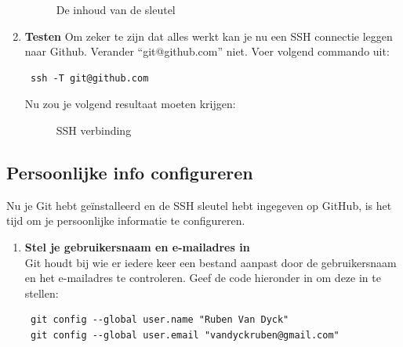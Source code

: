 \documentclass[12pt]{article} %
\begin{document}
\begin{enumerate}
\begin{figure}[H]
\caption{De inhoud van de sleutel}
\label{fig:sshkey}
\end{figure}

\item \textbf{Testen}
Om zeker te zijn dat alles werkt kan je nu een SSH connectie leggen naar Github.
Verander ``git@github.com'' niet. Voer volgend commando uit:
\begin{lstlisting}
 ssh -T git@github.com
\end{lstlisting}
Nu zou je volgend resultaat moeten krijgen:

\begin{figure}[H]
\caption{SSH verbinding}
\label{fig:sshauth}
\end{figure}



\end{enumerate}


\subsection{Persoonlijke info configureren} \label{sec:Persoonlijke info configureren}

Nu je Git hebt ge\"installeerd en de SSH sleutel hebt ingegeven op GitHub, is het tijd om je persoonlijke informatie te configureren.

\begin{enumerate}
 \item \textbf{Stel je gebruikersnaam en e-mailadres in} \\
Git houdt bij wie er iedere keer een bestand aanpast door de gebruikersnaam en het e-mailadres te controleren.
Geef de code hieronder in om deze in te stellen:
\begin{lstlisting}
 git config --global user.name "Ruben Van Dyck"
 git config --global user.email "vandyckruben@gmail.com"
\end{lstlisting}

\end{enumerate}
\end{document}
